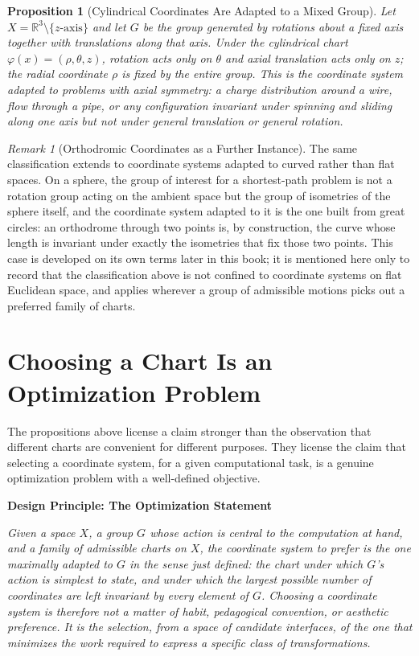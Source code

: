 \documentclass[11pt,fleqn]{book}
\numberwithin{equation}{chapter}
\newenvironment{principle}[1]
  {\begin{principleEnv}
   \noindent\textbf{Design Principle: #1}\par\smallskip\itshape}
  {\end{principleEnv}}
\theoremstyle{plain}
\newtheorem{proposition}[theorem]{Proposition}
\theoremstyle{definition}
\theoremstyle{remark}
\newtheorem{remark}[theorem]{Remark}
\newcommand{\R}{\mathbb{R}}
\begin{document}
\begin{proposition}[Cylindrical Coordinates Are Adapted to a Mixed Group]
Let \(X=\R^3\setminus\{z\text{-axis}\}\) and let \(G\) be the group generated by rotations about a fixed axis together with translations along that axis. Under the cylindrical chart \(\varphi(x)=(\rho,\theta,z)\), rotation acts only on \(\theta\) and axial translation acts only on \(z\); the radial coordinate \(\rho\) is fixed by the entire group. This is the coordinate system adapted to problems with axial symmetry: a charge distribution around a wire, flow through a pipe, or any configuration invariant under spinning and sliding along one axis but not under general translation or general rotation.
\end{proposition}

\begin{remark}[Orthodromic Coordinates as a Further Instance]
The same classification extends to coordinate systems adapted to curved rather than flat spaces. On a sphere, the group of interest for a shortest-path problem is not a rotation group acting on the ambient space but the group of isometries of the sphere itself, and the coordinate system adapted to it is the one built from great circles: an orthodrome through two points is, by construction, the curve whose length is invariant under exactly the isometries that fix those two points. This case is developed on its own terms later in this book; it is mentioned here only to record that the classification above is not confined to coordinate systems on flat Euclidean space, and applies wherever a group of admissible motions picks out a preferred family of charts.
\end{remark}

\section{Choosing a Chart Is an Optimization Problem}

The propositions above license a claim stronger than the observation that different charts are convenient for different purposes. They license the claim that selecting a coordinate system, for a given computational task, is a genuine optimization problem with a well-defined objective.

\begin{principle}{The Optimization Statement}
Given a space \(X\), a group \(G\) whose action is central to the computation at hand, and a family of admissible charts on \(X\), the coordinate system to prefer is the one maximally adapted to \(G\) in the sense just defined: the chart under which \(G\)'s action is simplest to state, and under which the largest possible number of coordinates are left invariant by every element of \(G\). Choosing a coordinate system is therefore not a matter of habit, pedagogical convention, or aesthetic preference. It is the selection, from a space of candidate interfaces, of the one that minimizes the work required to express a specific class of transformations.
\end{principle}
\end{document}
